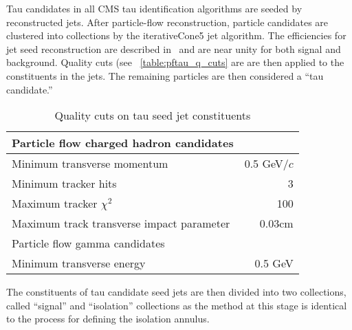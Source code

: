 Tau candidates in all CMS tau identification algorithms are seeded by
reconstructed jets.  After particle-flow reconstruction, particle candidates
are clustered into collections by the iterativeCone5 jet algorithm. The
efficiencies for jet seed reconstruction are described in~\cite{CMS-PAS-PFT-08-001} and are near
unity for both signal and background.  Quality cuts (see
~\ref{table:pftau_q_cuts} are are then applied to the constituents in the jets.
The remaining particles are then considered a ``tau candidate.''  

\begin{table}
   \centering
   \caption{Quality cuts on tau seed jet constituents} 
   \begin{tabular}{l r}
      Particle flow charged hadron candidates & \\
      \hline
      Minimum transverse momentum & 0.5 GeV/$c$ \\
      Minimum tracker hits & 3 \\
      Maximum tracker $\chi^2$ & 100 \\
      Maximum track transverse impact parameter & 0.03cm \\
      \hline \hline
      Particle flow gamma candidates & \\
      \hline
      Minimum transverse energy & 0.5 GeV \\
   \end{tabular}
\end{table}

The constituents of tau candidate seed jets are then divided into two
collections, called ``signal'' and ``isolation'' collections as the method at
this stage is identical to the process for defining the isolation annulus.
